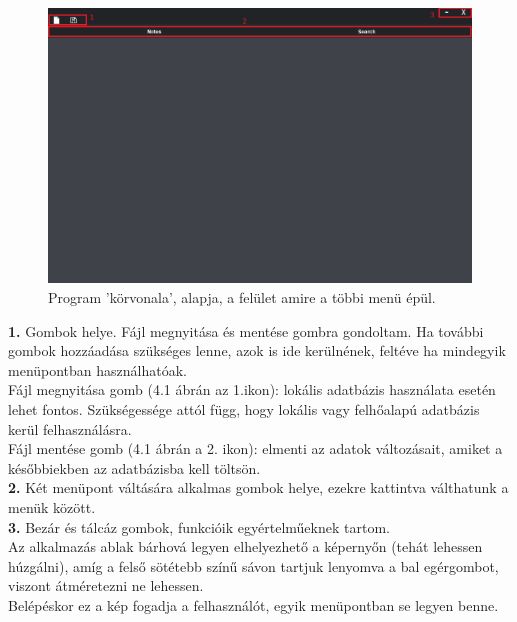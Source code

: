 \begin{figure}[h]
	\centering
	\includegraphics[scale=0.5]{images/menu_1.png}
	\caption{Program 'körvonala', alapja, a felület amire a többi menü épül.}
	\label{fig:main_foundation}
\end{figure}

\noindent \textbf{1.} Gombok helye. Fájl megnyitása és mentése gombra gondoltam. Ha további gombok hozzáadása szükséges lenne,  azok is ide kerülnének, feltéve ha mindegyik menüpontban használhatóak.
\vspace{5pt} \\Fájl megnyitása gomb (4.1 ábrán az 1.ikon): lokális adatbázis használata esetén lehet fontos. Szükségessége attól függ, hogy lokális vagy felhőalapú adatbázis kerül felhasználásra.
\vspace{5pt} \\Fájl mentése gomb (4.1 ábrán a 2. ikon): elmenti az adatok változásait, amiket a későbbiekben az adatbázisba kell töltsön.
\vspace{5pt} \\ \textbf{2.} Két menüpont váltására alkalmas gombok helye, ezekre kattintva válthatunk a menük között.
\vspace{5pt} \\ \textbf{3.} Bezár és tálcáz gombok, funkcióik egyértelműeknek tartom.
\vspace{10pt} \\Az alkalmazás ablak bárhová legyen elhelyezhető a képernyőn (tehát lehessen húzgálni), amíg a felső sötétebb színű sávon tartjuk lenyomva  a bal egérgombot, viszont átméretezni ne lehessen.
\vspace{5pt} \\Belépéskor ez a kép fogadja a felhasználót, egyik menüpontban se legyen benne. 

